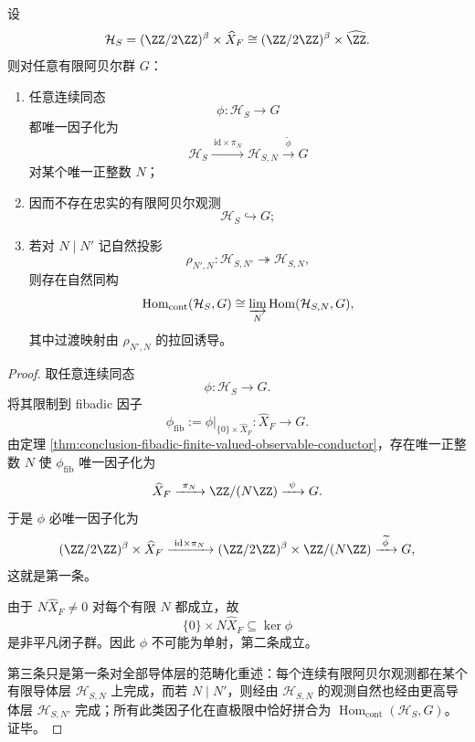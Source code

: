 \begin{theorem}[全局混合隐藏态不存在忠实有限阿贝尔观测]\label{thm:conclusion-global-mixed-hidden-state-no-faithful-finite-abelian-observation}
设
\[
\mathcal H_S=(\ZZ/2\ZZ)^\beta\times \widehat X_F
\cong
(\ZZ/2\ZZ)^\beta\times \widehat{\ZZ}.
\]
则对任意有限阿贝尔群 \(G\)：
\begin{enumerate}
  \item 任意连续同态
  \[
  \phi:\mathcal H_S\to G
  \]
  都唯一因子化为
  \[
  \mathcal H_S\xrightarrow{\ \mathrm{id}\times \pi_N\ } \mathcal H_{S,N}
  \xrightarrow{\ \widetilde\phi\ } G
  \]
  对某个唯一正整数 \(N\)；
  \item 因而不存在忠实的有限阿贝尔观测
  \[
  \mathcal H_S\hookrightarrow G;
  \]
  \item 若对 \(N\mid N'\) 记自然投影
  \[
  \rho_{N',N}:\mathcal H_{S,N'}\twoheadrightarrow \mathcal H_{S,N},
  \]
  则存在自然同构
  \[
  \operatorname{Hom}_{\mathrm{cont}}(\mathcal H_S,G)
  \cong
  \varinjlim_{N}\operatorname{Hom}(\mathcal H_{S,N},G),
  \]
  其中过渡映射由 \(\rho_{N',N}\) 的拉回诱导。
\end{enumerate}
\end{theorem}
\begin{proof}
取任意连续同态
\[
\phi:\mathcal H_S\to G.
\]
将其限制到 fibadic 因子
\[
\phi_{\mathrm{fib}}:=\phi|_{\{0\}\times \widehat X_F}:\widehat X_F\to G.
\]
由定理 \ref{thm:conclusion-fibadic-finite-valued-observable-conductor}，存在唯一正整数 \(N\) 使 \(\phi_{\mathrm{fib}}\) 唯一因子化为
\[
\widehat X_F\xrightarrow{\ \pi_N\ }\ZZ/(N\ZZ)\xrightarrow{\ \psi\ }G.
\]
于是 \(\phi\) 必唯一因子化为
\[
(\ZZ/2\ZZ)^\beta\times \widehat X_F
\xrightarrow{\ \mathrm{id}\times \pi_N\ }
(\ZZ/2\ZZ)^\beta\times \ZZ/(N\ZZ)
\xrightarrow{\ \widetilde\phi\ }G,
\]
这就是第一条。

由于 \(N\widehat X_F\neq 0\) 对每个有限 \(N\) 都成立，故
\[
\{0\}\times N\widehat X_F\subseteq \ker\phi
\]
是非平凡闭子群。因此 \(\phi\) 不可能为单射，第二条成立。

第三条只是第一条对全部导体层的范畴化重述：每个连续有限阿贝尔观测都在某个有限导体层 \(\mathcal H_{S,N}\) 上完成，而若 \(N\mid N'\)，则经由 \(\mathcal H_{S,N}\) 的观测自然也经由更高导体层 \(\mathcal H_{S,N'}\) 完成；所有此类因子化在直极限中恰好拼合为 \(\operatorname{Hom}_{\mathrm{cont}}(\mathcal H_S,G)\)。证毕。
\end{proof}




